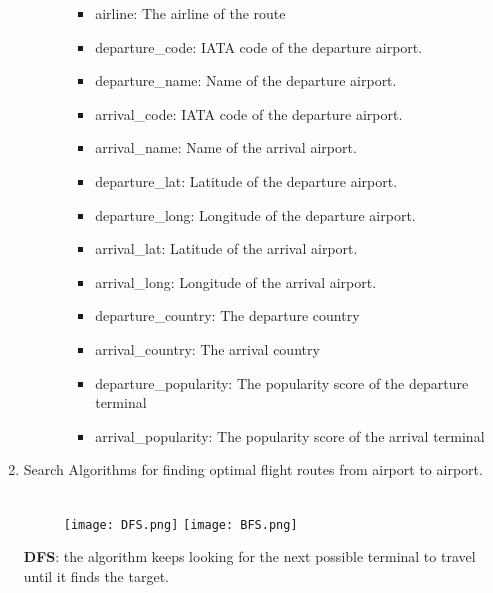 \documentclass[fontsize=11pt]{article}
\begin{document}
\begin{enumerate}
\begin{enumerate}
\begin{enumerate}
                \begin{itemize}
                    \item airline: The airline of the route
                    \item departure\_code: IATA code of the departure airport.
                    \item departure\_name: Name of the departure airport.
                     \item arrival\_code: IATA code of the departure airport.
                    \item arrival\_name: Name of the arrival airport.
                    \item departure\_lat: Latitude of the departure airport.
                    \item departure\_long: Longitude of the departure airport.
                    \item arrival\_lat: Latitude of the arrival airport.
                    \item arrival\_long: Longitude of the arrival airport.
                    \item departure\_country: The departure country
                    \item arrival\_country: The arrival country
                    \item departure\_popularity: The popularity score of the departure terminal
                    \item arrival\_popularity: The popularity score of the arrival terminal
                \end{itemize}
            \end{enumerate}

\end{enumerate}

    \item Search Algorithms for finding optimal flight routes from airport to airport.\\\\

    \begin{figure}[h]
            \centering
            \texttt{[image: DFS.png]}
            \texttt{[image: BFS.png]}
    \end{figure}
        
    \textbf{DFS}: the algorithm keeps looking for the next possible terminal to travel until it finds the target.
        
    \begin{enumerate}
        

\end{enumerate}
\end{enumerate}
\end{document}
